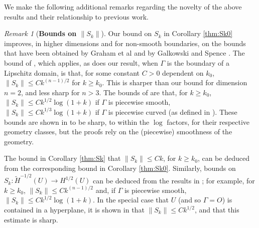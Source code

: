 \documentclass{birkjour}
\theoremstyle{definition}
\theoremstyle{remark}
\newtheorem{remark}[theorem]{Remark}
\numberwithin{equation}{section}
\begin{document}
We make the following additional remarks regarding the novelty of the above results and their relationship to previous work. 
\begin{remark}[\bf Bounds on $\|S_k\|$] 
Our bound on $S_k$ in Corollary \ref{thm:Sk0} improves, in higher dimensions and for non-smooth boundaries, on the  bounds that have been obtained by Graham et al \cite{GrLoMeSp:15} and by Galkowski and Spence \cite{GaSp2019}. %
The bound of \cite[Thm.~1.6 (i)]{GrLoMeSp:15}, which applies, as does our result, when $\Gamma$ is the boundary of a Lipschitz domain, is that, for some constant $C>0$ dependent on $k_0$, $\|S_k\|\leq Ck^{(n-1)/2}$ for $k\geq k_0$. This is sharper than our bound for dimension $n=2$, and less sharp for $n>3$. The bounds of   \cite[Thm.~1.5]{GaSp2019} are that, for $k\geq k_0$, $\|S_k\|\leq Ck^{1/2}\log(1+k)$ if $\Gamma$ is piecewise smooth, $\|S_k\|\leq Ck^{1/3}\log(1+k)$ if $\Gamma$ is piecewise curved
(as defined in  \cite{GaSp2019}). These bounds are shown in  \cite{GaSp2019} to be sharp, to within the $\log$ factors,  for their respective geometry classes, but the proofs rely on the (piecewise) smoothness of the geometry.

The bound  in Corollary \ref{thm:Sk}  that  $\|S_k\|\leq Ck$, for $k\geq k_0$, can be deduced from the corresponding bound in Corollary \ref{thm:Sk0}. Similarly, bounds on $S_k:\widetilde H^{-1/2}(U)\to H^{1/2}(U)$ can be deduced from the results in \cite{GrLoMeSp:15,GaSp2019}; for example, for $k\geq k_0$, $\|S_k\|\leq Ck^{(n-1)/2}$ and, if $\Gamma$ is piecewise smooth, $\|S_k\|\leq Ck^{1/2}\log(1+k)$. In the special case that $U$ (and so $\Gamma=O$) is contained in a hyperplane, it is shown in \cite{CWHewett2015} that $\|S_k\| \leq Ck^{1/2}$, and that this estimate is sharp.
\end{remark}
\end{document}

